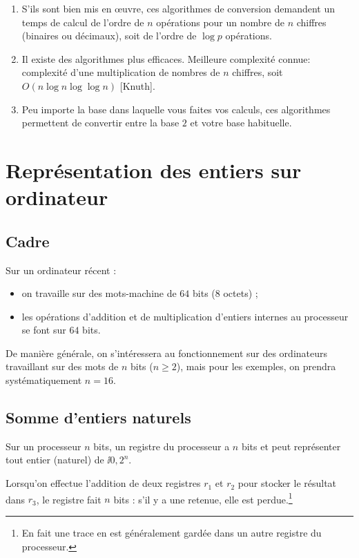 \begin{rem}
\begin{enumerate}
\item S'ils sont bien mis en œuvre, ces algorithmes de conversion demandent
un temps de calcul de l'ordre de $n$ opérations pour un nombre de $n$ chiffres
(binaires ou décimaux), soit de l'ordre de $\log p$ opérations.
\item Il existe des algorithmes plus efficaces. Meilleure complexité
  connue: complexité d'une multiplication de nombres de $n$ chiffres,
  soit $O(n\log n \log \log n)$ [Knuth].
\item Peu importe la base dans laquelle vous faites vos calculs, ces
  algorithmes permettent de convertir entre la base $2$ et votre base
  habituelle. 
\end{enumerate}
\end{rem}

\section{Représentation des entiers sur ordinateur}
\subsection{Cadre}
Sur un ordinateur récent :
\begin{itemize}
\item[\textbullet] on travaille sur des mots-machine de $64$ bits ($8$ octets) ;
\item[\textbullet] les opérations d'addition et de multiplication d'entiers internes au
  processeur se font sur $64$ bits.
\end{itemize}

De manière générale, on s'intéressera au fonctionnement sur des
ordinateurs travaillant sur des mots de $n$ bits ($n\geq 2$), mais pour les
exemples, on prendra systématiquement $n=16$.

\subsection{Somme d'entiers naturels}
\sloppy

Sur un processeur $n$ bits, un registre du processeur a $n$ bits et peut
  représenter tout entier (naturel) de $\ii{0,2^{n}}$.

 Lorsqu'on effectue l'addition de deux registres $r_{1}$ et
  $r_{2}$ pour stocker le résultat dans $r_{3}$, le registre fait $n$
  bits : s'il y a une retenue, elle est perdue.\footnote{En fait une
    trace en est généralement gardée dans un autre registre du
    processeur.}

